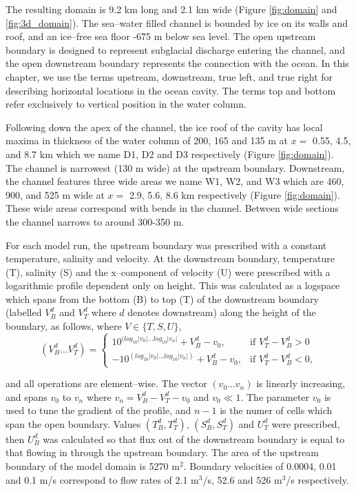 The resulting domain is 9.2 km long and 2.1 km wide (Figure \ref{fig:domain} and \ref{fig:3d_domain}). The sea--water filled channel is bounded by ice on its walls and roof, and an ice--free sea floor -675 m below sea level. The open upstream boundary is designed to represent subglacial discharge entering the channel, and the open downstream boundary represents the connection with the ocean. In this chapter, we use the terms upstream, downstream, true left, and true right for describing horizontal locations in the ocean cavity. 
The terms top and bottom refer exclusively to vertical position in the water column.

Following down the apex of the channel, the ice roof of the cavity has local maxima in thickness of the water column of 200, 165 and 135 m at $x=$ 0.55, 4.5, and 8.7 km which we name D1, D2 and D3 respectively (Figure \ref{fig:domain}). The channel is narrowest (130 m wide) at the upstream boundary. Downstream, the channel features three wide areas we name W1, W2, and W3 which are 460, 900, and 525 m wide at $x =$ 2.9, 5.6, 8.6 km respectively (Figure \ref{fig:domain}). These wide areas correspond with bends in the channel. Between wide sections the channel narrows to around 300-350 m. 


For each model run, the upstream boundary was prescribed with a constant temperature, salinity and velocity. At the downstream boundary, temperature (T), salinity (S) and the x--component of velocity (U) were prescribed with a logarithmic profile dependent only on height. This was calculated as a logspace which spans from the bottom (B) to top (T) of the downstream boundary (labelled $V^d_B$ and $V^d_T $ where $d$ denotes downstream) along the height of the boundary, as follows, where $V \in \{T,S,U\}$,
\[
    \left(V^d_B \dots V^d_T \right)= 
\begin{cases}
    10^{(log_{10}|v_0|...log_{10}|v_n|} + V^d_B - v_0, & \text{if } V^d_T - V^d_B>0\\
    -10^{(log_{10}|v_0|...log_{10}|v_n|)} + V^d_B - v_0,              & \text{if }   V^d_T - V^d_B<0,
\end{cases}
\]

and all operations are element--wise. The vector $(v_0...v_n)$ is linearly increasing, and spans $v_0$ to $v_n$ where $ v_n = V^d_B - V^d_T-v_0$ and $v_0 \ll 1$. The parameter $v_0$ is used to tune the gradient of the profile, and $n-1$ is the numer of cells which span the open boundary.
Values $\left(T^d_B, T^d_T\right)$, $\left(S^d_B, S^d_T\right)$ and $U^d_T$  were prescribed, then  $U^d_B$ was calculated so that flux out of the downstream boundary is equal to that flowing in through the upstream boundary.
The area of the upstream boundary of the model domain is 5270 $\mathrm{m}^2$. Boundary velocities of 0.0004, 0.01 and 0.1 $\mathrm{m}$/s correspond to flow rates of 2.1 $\mathrm{m}^3$/s, 52.6 and 526 $\mathrm{m}^3$/s respectively. 

